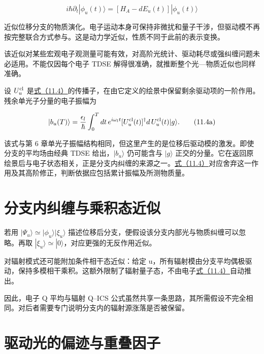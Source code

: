 \documentclass[UTF8,a4paper,zihao=-4,openany,fontset=fandol]{ctexbook}
\begin{document}
\begin{equation*}
i\hbar\partial_t|\phi_u(t)\rangle
=[H_A-dE_u(t)]|\phi_u(t)\rangle
\tag{11.4}\label{eq:11.4}
\end{equation*}


近似位移分支的物质演化。电子运动本身可保持非微扰和量子干涉，但驱动模不再按完整联合方式参与。这是动力学近似，性质不同于此前的表示变换。



该近似对某些宏观电子观测量可能有效，对高阶光统计、驱动耗尽或强纠缠问题未必适用。不能仅因每个电子 TDSE 解得很准确，就推断整个光—物质近似也同样准确。



设 $U_u^{\rm cl}$ 是\hyperref[eq:11.4]{式（11.4）}的传播子，在由它定义的绘景中保留剩余驱动项的一阶作用。残余单光子分量的电子振幅为



\begin{equation*}
|b_u(T)\rangle=\frac{\epsilon_l}{\hbar}
\int_0^Tdt\,e^{i\omega_lt}
[U_u^{\rm cl}(t)]^\dagger d\,U_u^{\rm cl}(t)|g\rangle .
\tag{11.4a}\label{eq:11.4a}
\end{equation*}


该式与第 6 章单光子振幅结构相同，但这里产生的是位移后驱动模的激发。即使分支的平均场由经典 TDSE 给出，$|b_u\rangle$ 仍可能含与 $|g\rangle$ 正交的分量。它在返回原绘景后与电子状态相关，正是分支内纠缠的来源之一。\hyperref[eq:11.4]{式（11.4）}对应舍弃这一作用及其高阶修正，判断依据应包括累计振幅及所测物质量。



\section{分支内纠缠与乘积态近似}\label{sec:11:7}


若用 $|\Psi_u\rangle\simeq|\phi_u\rangle|\xi_u\rangle$ 描述位移后分支，便假设该分支内部光与物质纠缠可以忽略。再取 $|\xi_u\rangle\simeq|0\rangle$，对应更强的无反作用近似。



对辐射模式还可能附加条件相干态近似：给定 u，所有辐射模由分支平均偶极驱动，保持多模相干乘积。这额外限制了辐射量子态，不由电子\hyperref[eq:11.4]{式（11.4）}自动推出。



因此，电子 Q 平均与辐射 Q–ICS 公式虽然共享一条思路，其所需假设不完全相同。对后者需要专门说明分支内的辐射源涨落是否被保留。



\section{驱动光的偏迹与重叠因子}\label{sec:11:8}
\end{document}
